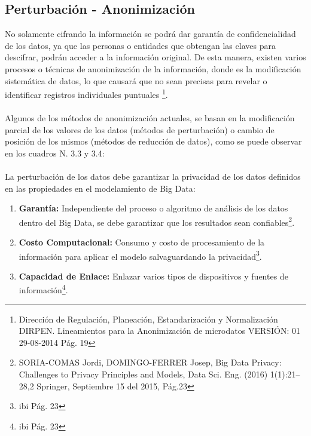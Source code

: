 \documentclass[a4paper,openright,12pt]{book}
\theoremstyle{definition}
\theoremstyle{remark}
\begin{document}
    \subsection{Perturbación - Anonimización}
No solamente cifrando la información se podrá dar garantía de confidencialidad de los datos, ya que las personas o entidades que obtengan las claves para descifrar, podrán acceder a la información original. De esta manera, existen varios procesos o técnicas de anonimización de la información, donde es la modificación sistemática de datos, lo que causará que no sean precisas para revelar o identificar registros individuales puntuales \footnote{Dirección de Regulación, Planeación, Estandarización y Normalización DIRPEN. Lineamientos para
la Anonimización de microdatos VERSIÓN: 01 29-08-2014 Pág. 19}.\\\\
Algunos de los métodos de anonimización actuales, se basan en la modificación parcial de los valores de los datos (métodos de perturbación) o cambio de posición de los mismos (métodos de reducción de datos), como se puede observar en los cuadros N. 3.3 y 3.4:\\\\
La perturbación de los datos debe garantizar la privacidad de los datos definidos en las propiedades en el modelamiento de Big Data:
\begin{enumerate}
	\item \textbf{Garantía:} Independiente del proceso o algoritmo de análisis de los datos dentro del Big Data, se debe garantizar que los resultados sean confiables\footnote{SORIA-COMAS Jordi, DOMINGO-FERRER Josep, 
Big Data Privacy: Challenges to Privacy Principles and Models, Data Sci. Eng. (2016) 1(1):21–28,2 Springer, Septiembre 15 del 2015, Pág.23}.
	\item \textbf{Costo Computacional:} Consumo y costo de procesamiento de la información para aplicar el modelo salvaguardando la privacidad\footnote{ibi Pág. 23}.
	\item \textbf{Capacidad de Enlace:} Enlazar varios tipos de dispositivos y fuentes de información\footnote{ibi Pág. 23}.
\end{enumerate}
\end{document}

